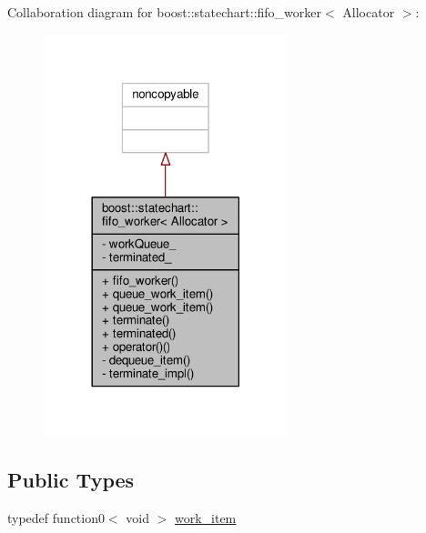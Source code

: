 Collaboration diagram for boost\+:\+:statechart\+:\+:fifo\+\_\+worker$<$ Allocator $>$\+:
\nopagebreak
\begin{figure}[H]
\begin{center}
\leavevmode
\includegraphics[width=201pt]{classboost_1_1statechart_1_1fifo__worker__coll__graph}
\end{center}
\end{figure}
\subsection*{Public Types}
\begin{DoxyCompactItemize}
\item 
typedef function0$<$ void $>$ \mbox{\hyperlink{classboost_1_1statechart_1_1fifo__worker_ac90f6805565bb3e8d65e4cdde96d90c2}{work\+\_\+item}}
\end{DoxyCompactItemize}
